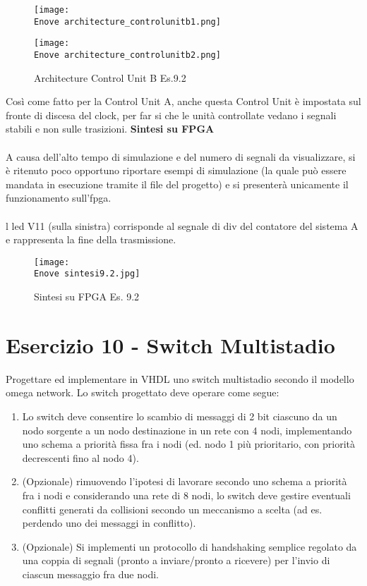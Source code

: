 \documentclass[12pt]{article}
\def \Enove {Allegati/Esercizio9/}
\begin{document}
\clearpage
\begin{figure}[ht!]
    \texttt{[image: \\Enove architecture\_controlunitb1.png]}
\end{figure}
\begin{figure}[ht!]
    \texttt{[image: \\Enove architecture\_controlunitb2.png]}
    \caption{Architecture Control Unit B Es.9.2}
\end{figure}
Così come fatto per la Control Unit A, anche questa Control Unit è impostata sul fronte di discesa del clock, per far si che le unità controllate vedano i segnali stabili e non sulle trasizioni.
\clearpage
{\large \textbf{Sintesi su FPGA}}
\\\\A causa dell’alto tempo di simulazione e del numero di segnali da visualizzare, si è ritenuto poco opportuno riportare esempi di simulazione (la quale può essere mandata in esecuzione tramite il file del progetto) e si presenterà unicamente il funzionamento sull’fpga.
\\\\l led V11 (sulla sinistra) corrisponde al segnale di div del contatore del sistema A e rappresenta la fine della trasmissione.
\begin{figure}[ht!]
    \centering
    \texttt{[image: \\Enove sintesi9.2.jpg]}
    \caption{Sintesi su FPGA Es. 9.2}
\end{figure}
\clearpage
\section{Esercizio 10 - Switch Multistadio}
Progettare ed implementare in VHDL uno switch multistadio secondo il modello omega network. Lo switch progettato deve operare come segue:
\begin{enumerate}[label=\alph*.]
    \item Lo switch deve consentire lo scambio di messaggi di 2 bit ciascuno da un nodo sorgente a un nodo destinazione in un rete con 4 nodi, implementando uno schema a priorità fissa fra i nodi (ed. nodo 1 più prioritario, con priorità decrescenti fino al nodo 4).
    \item (Opzionale) rimuovendo l’ipotesi di lavorare secondo uno schema a priorità fra i nodi e considerando una rete di 8 nodi, lo switch deve gestire eventuali conflitti generati da collisioni secondo un meccanismo a scelta (ad es. perdendo uno dei messaggi in conflitto).
    \item (Opzionale) Si implementi un protocollo di handshaking semplice regolato da una coppia di segnali (pronto a inviare/pronto a ricevere) per l’invio di ciascun messaggio fra due nodi.
\end{enumerate}
\end{document}
